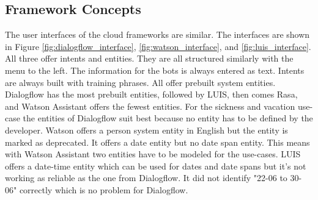 \subsection*{Framework Concepts}
The user interfaces of the cloud frameworks are similar.
The interfaces are shown in Figure \ref{fig:dialogflow_interface},
\ref{fig:watson_interface}, and \ref{fig:luis_interface}.
All three offer intents and entities.
They are all structured similarly with the menu to the left.
The information for the bots is always entered as text.
Intents are always built with training phrases.
All offer prebuilt system entities.
Dialogflow has the most prebuilt entities, followed by LUIS,
then comes Rasa, and Watson Assistant offers the fewest entities.
For the sickness and vacation use-case the entities of 
Dialogflow suit best because no entity has to be defined by 
the developer. 
Watson offers a person system entity in English but the entity
is marked as deprecated.
It offers a date entity but no date span entity.
This means with Watson Assistant two entities have to be 
modeled for the use-cases.
LUIS offers a date-time entity which can be used for dates and 
date spans but it's not working as reliable as the one from 
Dialogflow.
It did not identify "22-06 to 30-06" correctly
which is no problem for Dialogflow.
